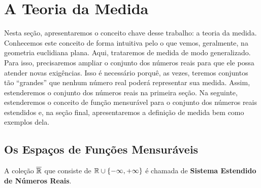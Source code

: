 \chapter{A Teoria da Medida}
    Nesta seção, apresentaremos o conceito chave desse trabalho: a teoria da medida.
    Conhecemos este conceito de forma intuitiva pelo o que vemos, geralmente, na geometria euclidiana plana.
    Aqui, trataremos de medida de modo generalizado. 
    Para isso, precisaremos ampliar o conjunto dos números reais para que ele possa atender novas exigências.
    Isso é necessário porquê, as vezes, teremos conjuntos tão \enquote{grandes} que nenhum número real poderá representar sua medida. 
    Assim, estenderemos o conjunto dos números reais na primeira seção.
    Na seguinte, estenderemos o conceito de função mensurável para o conjunto dos números reais estendidos e, na seção final, apresentaremos a definição de medida bem como exemplos dela.
\section{Os Espaços de Funções Mensuráveis}

    \begin{definition}
    \label{def:reta-estendida}
        A coleção $\operatorname{\overline{\mathbb{R}}}$ que consiste de $\mathbb{R} \cup \{-\infty, +\infty\}$ é chamada de \textbf{Sistema Estendido de Números Reais}.
    \end{definition}

